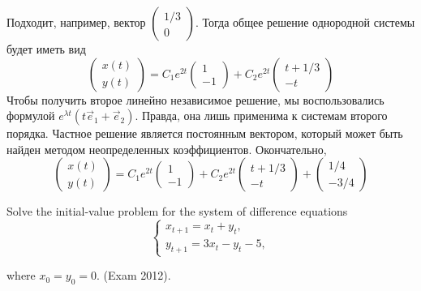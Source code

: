 \begin{solution}
Подходит, например, вектор $\begin{pmatrix}
1/3 \\
0
\end{pmatrix}$. 
Тогда общее решение однородной системы будет иметь вид 
\[
\begin{pmatrix}
x(t) \\
y(t)
\end{pmatrix} =
C_1 e^{2t} 
\begin{pmatrix}
1 \\
-1
\end{pmatrix}
+ C_2 e^{2t}
\begin{pmatrix}
t+1/3 \\
-t
\end{pmatrix}
\]
Чтобы получить второе линейно независимое решение, мы воспользовались формулой $e^{\lambda t }(t\vec{e}_1+\vec{e}_2)$. Правда, она лишь применима к системам второго порядка. Частное решение является постоянным вектором, который может быть найден методом неопределенных коэффициентов. Окончательно, 
\[
\begin{pmatrix}
x(t) \\
y(t)
\end{pmatrix} =
C_1 e^{2t} 
\begin{pmatrix}
1 \\
-1
\end{pmatrix}
+ C_2 e^{2t}
\begin{pmatrix}
t+1/3 \\
-t
\end{pmatrix}+
\begin{pmatrix}
1/4 \\
-3/4
\end{pmatrix}
\]
\end{solution}

\begin{problem}
Solve the initial-value problem for the system of difference equations 
\[
\begin{cases} 
x_{t+1} =x_{t} +y_{t} , \\ 
y_{t+1} =3x_{t} -y_{t} -5,
\end{cases}
\]

where $x_{0} =y_{0} =0$. (Exam 2012).
\end{problem}

